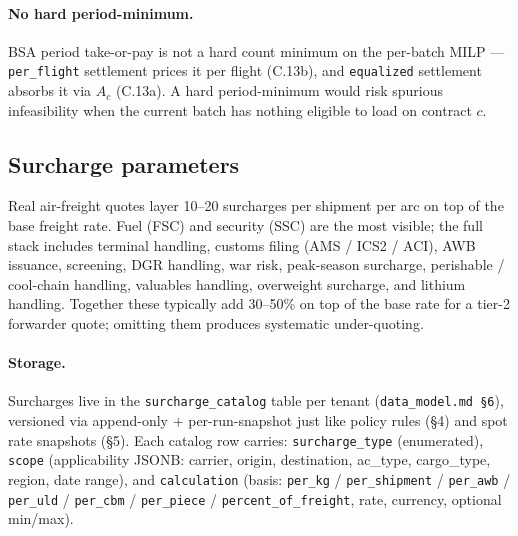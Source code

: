 \documentclass[11pt,a4paper]{article}
\theoremstyle{definition}
\begin{document}
\paragraph{No hard period-minimum.}
BSA period take-or-pay is not a hard count minimum on the per-batch MILP ---
\texttt{per\_flight} settlement prices it per flight (C.13b), and
\texttt{equalized} settlement absorbs it via $A_c$ (C.13a). A hard
period-minimum would risk spurious infeasibility when the current batch has
nothing eligible to load on contract $c$.

\subsection{Surcharge parameters}
\label{sec:surcharge}

Real air-freight quotes layer 10--20 surcharges per shipment per arc on top of
the base freight rate. Fuel (FSC) and security (SSC) are the most visible;
the full stack includes terminal handling, customs filing (AMS / ICS2 / ACI),
AWB issuance, screening, DGR handling, war risk, peak-season surcharge,
perishable / cool-chain handling, valuables handling, overweight surcharge,
and lithium handling. Together these typically add 30--50\% on top of the
base rate for a tier-2 forwarder quote; omitting them produces systematic
under-quoting.

\paragraph{Storage.}
Surcharges live in the \texttt{surcharge\_catalog} table per tenant
(\texttt{data\_model.md \S6}), versioned via append-only $+$ per-run-snapshot
just like policy rules (\S4) and spot rate snapshots (\S5). Each catalog row
carries: \texttt{surcharge\_type} (enumerated), \texttt{scope} (applicability
JSONB: carrier, origin, destination, ac\_type, cargo\_type, region, date
range), and \texttt{calculation} (basis: \texttt{per\_kg} / \texttt{per\_shipment}
/ \texttt{per\_awb} / \texttt{per\_uld} / \texttt{per\_cbm} / \texttt{per\_piece}
/ \texttt{percent\_of\_freight}, rate, currency, optional min/max).
\end{document}
